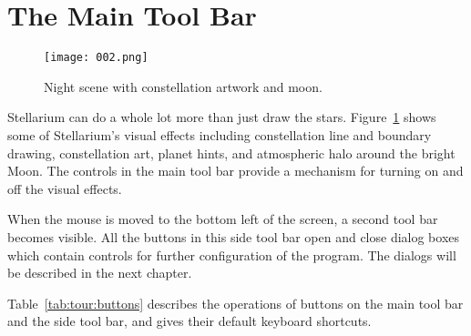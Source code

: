 \section{The Main Tool Bar}
\label{sec:tour:toolbar}

\begin{figure}[htb]
\centering\texttt{[image: 002.png]}
\caption{Night scene with constellation artwork and moon.}
\label{fig:002}
\end{figure}

Stellarium can do a whole lot more than just draw the stars. Figure~\ref{fig:002}
shows some of Stellarium's visual effects including constellation
line and boundary drawing, constellation art, planet hints, and
atmospheric halo around the bright Moon. The controls in the main tool bar
provide a mechanism for turning on and off the visual effects.

When the mouse is moved to the bottom left of the screen, a second
tool bar becomes visible. All the buttons in this side tool bar open
and close dialog boxes which contain controls for further
configuration of the program. The dialogs will be described in the
next chapter.


Table~\ref{tab:tour:buttons} describes the operations of buttons
on the main tool bar and the side tool bar, and gives their default
keyboard shortcuts.

